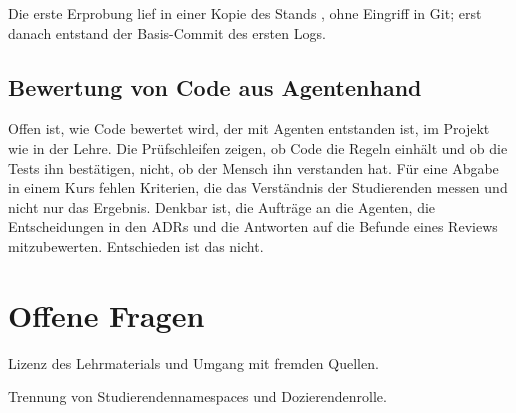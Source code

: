 Die erste Erprobung lief in einer Kopie des Stands , ohne Eingriff in Git;
erst danach entstand der Basis-Commit des ersten Logs.

\subsection{Bewertung von Code aus Agentenhand}

Offen ist, wie Code bewertet wird, der mit Agenten entstanden ist,
im Projekt wie in der Lehre.
Die Prüfschleifen zeigen, ob Code die Regeln einhält und ob die Tests ihn bestätigen,
nicht, ob der Mensch ihn verstanden hat.
Für eine Abgabe in einem Kurs fehlen Kriterien, die das Verständnis der Studierenden messen
und nicht nur das Ergebnis.
Denkbar ist, die Aufträge an die Agenten, die Entscheidungen in den ADRs
und die Antworten auf die Befunde eines Reviews mitzubewerten.
Entschieden ist das nicht.

\section{Offene Fragen}

\startitemize
\item Lizenz des Lehrmaterials und Umgang mit fremden Quellen.
\item Trennung von Studierendennamespaces und Dozierendenrolle.
\stopitemize
